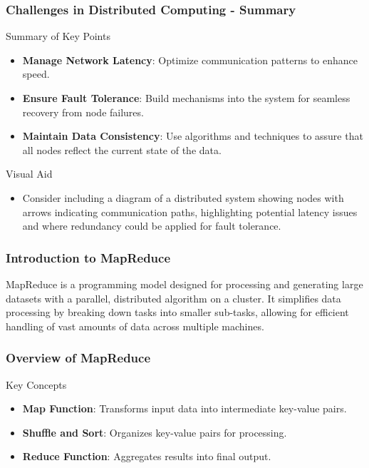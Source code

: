 \documentclass[aspectratio=169]{beamer}
\begin{document}
\begin{frame}[fragile]
  \frametitle{Challenges in Distributed Computing - Summary}
  \begin{block}{Summary of Key Points}
    \begin{itemize}
      \item \textbf{Manage Network Latency}: Optimize communication patterns to enhance speed.
      \item \textbf{Ensure Fault Tolerance}: Build mechanisms into the system for seamless recovery from node failures.
      \item \textbf{Maintain Data Consistency}: Use algorithms and techniques to assure that all nodes reflect the current state of the data.
    \end{itemize}
  \end{block}

  \begin{block}{Visual Aid}
    \begin{itemize}
      \item Consider including a diagram of a distributed system showing nodes with arrows indicating communication paths, highlighting potential latency issues and where redundancy could be applied for fault tolerance.
    \end{itemize}
  \end{block}
\end{frame}

\begin{frame}
    \frametitle{Introduction to MapReduce}
    MapReduce is a programming model designed for processing and generating large datasets with a parallel, distributed algorithm on a cluster. 
    It simplifies data processing by breaking down tasks into smaller sub-tasks, allowing for efficient handling of vast amounts of data across multiple machines.
\end{frame}

\begin{frame}
    \frametitle{Overview of MapReduce}
    \begin{block}{Key Concepts}
        \begin{itemize}
            \item \textbf{Map Function}: Transforms input data into intermediate key-value pairs.
            \item \textbf{Shuffle and Sort}: Organizes key-value pairs for processing.
            \item \textbf{Reduce Function}: Aggregates results into final output.
        \end{itemize}
    \end{block}
\end{frame}
\end{document}
